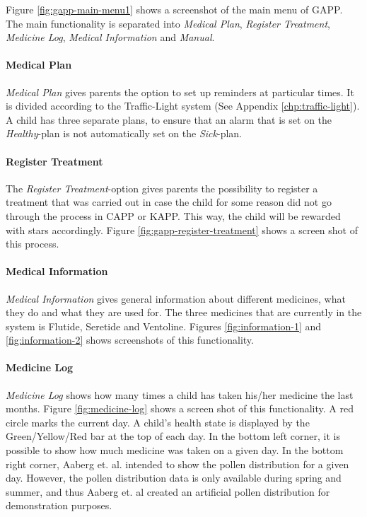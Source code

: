 Figure \ref{fig:gapp-main-menu1} shows a screenshot of the main menu of GAPP. The main functionality is separated into 
\emph{Medical Plan}, \emph{Register Treatment}, \emph{Medicine Log}, \emph{Medical Information} and \emph{Manual}. 

\paragraph{Medical Plan}
\emph{Medical Plan} gives parents the option to set up reminders at particular times. It is divided according to the Traffic-Light system (See Appendix \ref{chp:traffic-light}). A child has three separate plans, to ensure that an alarm that is set on the \emph{Healthy}-plan is not automatically set on the \emph{Sick}-plan.   

\paragraph{Register Treatment}
The \emph{Register Treatment}-option gives parents the possibility to register a treatment that was carried out in case the child for some reason did not go through the process in CAPP or KAPP. This way, the child will be rewarded with stars accordingly. Figure \ref{fig:gapp-register-treatment} shows a screen shot of this process.  

\paragraph{Medical Information}
\emph{Medical Information} gives general information about different medicines, what they do and what they are used for. The three medicines that are currently in the system is Flutide, Seretide and Ventoline. Figures \ref{fig:information-1} and \ref{fig:information-2} shows screenshots of this functionality.

\paragraph{Medicine Log}
\emph{Medicine Log} shows how many times a child has taken his/her medicine the last months. Figure \ref{fig:medicine-log} shows a screen shot of this functionality. A red circle marks the current day. A child's health state is displayed by the Green/Yellow/Red bar at the top of each day. In the bottom left corner, it is possible to show how much medicine was taken on a given day.
In the bottom right corner, Aaberg et. al. intended to show the pollen distribution for a given day. However, the pollen distribution data is only available during spring and summer, and thus Aaberg et. al created an artificial pollen distribution for demonstration purposes. 

